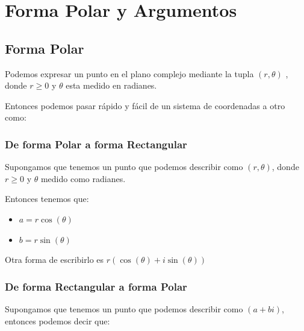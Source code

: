 \documentclass[12pt, fleqn]{report}                             %
\newcommand{\Wrap}[1]{\left( #1 \right)}                        %
\newcommand{\Cos}[1]{\cos\Wrap{#1}}                             %
\newcommand{\Sin}[1]{\sin\Wrap{#1}}                             %
\begin{document}
    \chapter{Forma Polar y Argumentos}

        \clearpage
        \section{Forma Polar}
            
            Podemos expresar un punto en el plano complejo mediante la tupla $(r, \theta)$ , donde
            $r \geq 0$ y $\theta$ esta medido en radianes.

            Entonces podemos pasar rápido y fácil de un sistema de coordenadas a otro como:

            \subsection{De forma Polar a forma Rectangular}

                Supongamos que tenemos un punto que podemos describir como $(r, \theta)$,
                donde $r \geq 0$ y $\theta$ medido como radianes.

                Entonces tenemos que:

                \begin{itemize}
                     \item $a = r \Cos{\theta}$
                     \item $b = r \Sin{\theta}$
                 \end{itemize}

                 Otra forma de escribirlo es $r(\Cos{\theta} + i\Sin{\theta})$

            \subsection{De forma Rectangular a forma Polar}

                Supongamos que tenemos un punto que podemos describir como $(a+bi)$,
                entonces podemos decir que:
\end{document}
